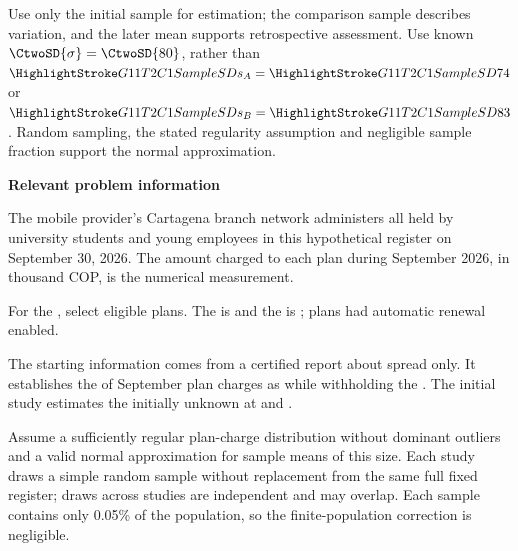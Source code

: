Use only the initial sample for estimation; the comparison sample describes variation, and the later mean supports retrospective assessment. Use known $\CtwoSD{\sigma}=\CtwoSD{80}$, rather than $\SSD{s_A}=\SSD{74}$ or $\SSD{s_B}=\SSD{83}$. Random sampling, the stated regularity assumption and negligible sample fraction support the normal approximation.

\secInicio[][sec:p2]

\clearpage

\clearpage



\textbf{Relevant problem information}

\begin{probleminfoexcerpt}
The mobile provider's Cartagena branch network administers all      held by university students and young employees in this hypothetical register on September 30, 2026. The amount charged to each plan during September 2026, in thousand COP, is the numerical measurement.
\end{probleminfoexcerpt}

\begin{probleminfoexcerpt}
For the    , select  eligible plans. The    is    and the    is   ;  plans had automatic renewal enabled.
\end{probleminfoexcerpt}

\begin{probleminfoexcerpt}
The starting information comes from a certified report about spread only. It establishes the    of September plan charges as    while withholding the  . The initial study estimates the initially unknown   at  and  .
\end{probleminfoexcerpt}

\begin{probleminfoexcerpt}
Assume a sufficiently regular plan-charge distribution without dominant outliers and a valid normal approximation for sample means of this size. Each study draws a simple random sample without replacement from the same full fixed register; draws across studies are independent and may overlap. Each sample contains only 0.05\% of the population, so the finite-population correction is negligible.
\end{probleminfoexcerpt}

